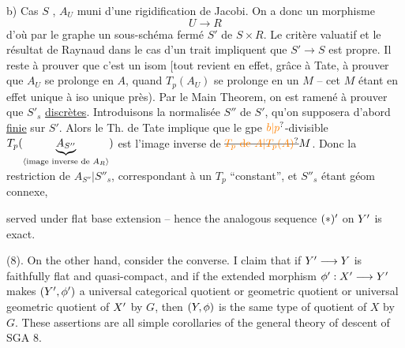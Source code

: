 

b) Cas $S$  , $A_U$ muni d'une rigidification de Jacobi. On a donc un morphisme
\[
U\longrightarrow R
\]
d'où par  le graphe un sous-schéma fermé $S'$ de $S\times R$. Le critère valuatif et le résultat de Raynaud dans le cas d'un trait impliquent que $S'\longrightarrow S$ est propre. Il reste à prouver que c'est un isom [tout revient en effet, grâce à Tate, à prouver que $A_U$ se prolonge en $A$, quand $T_p(A_U)$ se prolonge en un $M$ -- cet $M$ étant en effet unique à iso unique près). Par le Main Theorem, on est ramené à prouver que   $S'_s$  \uline{discrètes}. Introduisons la normalisée $S''$ de $S'$, qu'on supposera d'abord \uline{finie} sur $S'$. Alors le Th. de Tate implique que le gpe $\unsure{b|p}$-divisible $T_p(\underbrace{A_{S''}}_{\inserted{\text{image inverse de }A_R}})$ est l'image inverse de $\deleted{\unsure{T_p\text{ de }A|T_p(A)}}M$. Donc la restriction de $A_{S''}|S''_s$, correspondant à un $T_p$ ``constant'', et $S''_s$ étant géom connexe,


served under flat base extension -- hence the analogous sequence $(*)^{\prime}$ on $Y^{\prime}$ is exact.

(8). On the other hand, consider the converse. I claim that if $Y^{\prime}\longrightarrow Y$ is faithfully flat and quasi-compact, and if the extended morphism $\phi^{\prime}:X^{\prime}\longrightarrow Y^{\prime}$ makes $(Y^{\prime},\phi^{\prime})$ a universal categorical quotient or geometric quotient or universal geometric quotient of $X^{\prime}$ by $G$, then $(Y,\phi)$ is the same type of quotient of $X$ by $G$. These assertions are all simple corollaries of the general theory of descent of SGA 8.

